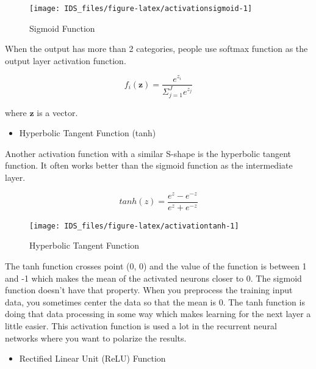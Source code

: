 \documentclass[
  12pt,
]{krantz}
\providecommand{\tightlist}{%
  \setlength{\itemsep}{0pt}\setlength{\parskip}{0pt}}
\begin{document}
\begin{figure}

{\centering \texttt{[image: IDS\_files/figure-latex/activationsigmoid-1]} 

}

\caption{Sigmoid Function}\label{fig:activationsigmoid}
\end{figure}

When the output has more than 2 categories, people use softmax function as the output layer activation function.

\begin{equation}
f_i(\mathbf{z}) = \frac{e^{z_i}}{\Sigma_{j=1}^{J} e^{z_j} }
\label{eq:softmax}
\end{equation}

where \(\mathbf{z}\) is a vector.

\begin{itemize}
\tightlist
\item
  Hyperbolic Tangent Function (tanh)
\end{itemize}

Another activation function with a similar S-shape is the hyperbolic tangent function. It often works better than the sigmoid function as the intermediate layer.

\begin{equation}
tanh(z) = \frac{e^{z} - e^{-z}}{e^{z} + e^{-z}}
\label{eq:tanh}
\end{equation}

\begin{figure}

{\centering \texttt{[image: IDS\_files/figure-latex/activationtanh-1]} 

}

\caption{Hyperbolic Tangent Function}\label{fig:activationtanh}
\end{figure}

The tanh function crosses point (0, 0) and the value of the function is between 1 and -1 which makes the mean of the activated neurons closer to 0. The sigmoid function doesn't have that property. When you preprocess the training input data, you sometimes center the data so that the mean is 0. The tanh function is doing that data processing in some way which makes learning for the next layer a little easier. This activation function is used a lot in the recurrent neural networks where you want to polarize the results.

\begin{itemize}
\tightlist
\item
  Rectified Linear Unit (ReLU) Function
\end{itemize}
\end{document}
